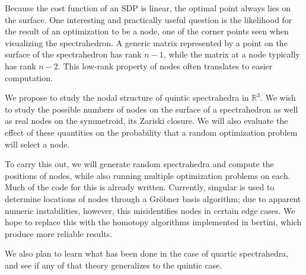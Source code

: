\documentclass[12pt]{amsart}
\begin{document}
Because the cost function of an SDP is linear, the optimal point
always lies on the surface.  One interesting and practically useful
question is the likelihood for the result of an optimization to be a
node, one of the corner points seen when visualizing the
spectrahedron.  A generic matrix represented by a point on the surface
of the spectrahedron has rank $n-1$, while the matrix at a node
typically has rank $n-2$.  This low-rank property of nodes often
translates to easier computation.

We propose to study the nodal structure of quintic spectrahedra in
$\mathbb{R}^3$.  We wish to study the possible numbers of nodes on the
surface of a spectrahedron as well as real nodes on the symmetroid,
its Zariski closure.  We will also evaluate the effect of these
quantities on the probability that a random optimization problem will
select a node.

To carry this out, we will generate random spectrahedra and compute
the positions of nodes, while also running multiple optimization
problems on each.  Much of the code for this is already
written.  Currently, singular is used to determine locations of nodes
through a Gr\"obner basis algorithm; due to apparent numeric
instabilities, however, this misidentifies nodes in certain edge
cases.  We hope to replace this with the homotopy algorithms
implemented in bertini, which produce more reliable results.

We also plan to learn what has been done in the case of quartic spectrahedra,
and see if any of that theory generalizes to the quintic case.
\end{document}
